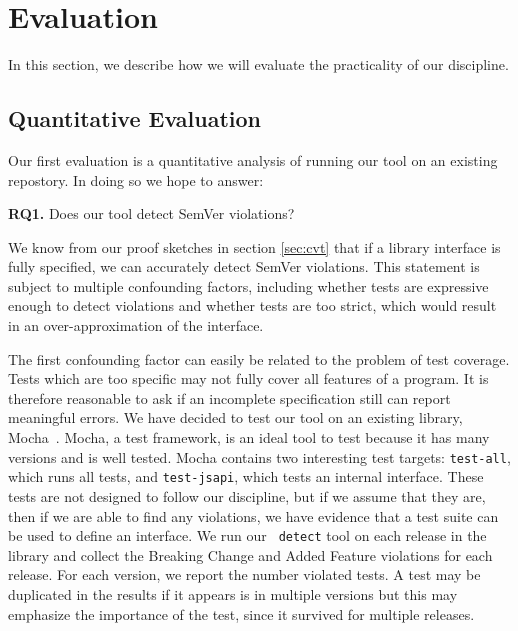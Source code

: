 \section{Evaluation}


In this section, we describe how we will evaluate the practicality of
our discipline.

\subsection{Quantitative Evaluation}

Our first evaluation is a quantitative analysis of running our tool on
an existing repostory. In doing so we hope to answer:

{\bf RQ1.} Does our tool detect SemVer violations?

We know from our proof sketches in section \ref{sec:cvt} that if a
library interface is fully specified, we can accurately detect SemVer
violations. This statement is subject to multiple confounding
factors, including whether tests are expressive enough to detect
violations and whether tests are too strict, which would result in an
over-approximation of the interface.

The first confounding factor can easily be related to the problem of
test coverage. Tests which are too specific may not fully cover all
features of a program. It is therefore reasonable to ask if an
incomplete specification still can report meaningful errors. We have
decided to test our tool on an existing library,
Mocha~\cite{mocha}. Mocha, a test framework, is an ideal tool to test
because it has many versions and is well tested. Mocha contains two
interesting test targets: {\tt test-all}, which runs all tests, and
{\tt test-jsapi}, which tests an internal interface. These tests are
not designed to follow our discipline, but if we assume that they
are, then if we are able to find any violations, we have evidence
that a test suite can be used to define an interface. We run our {\tt
  detect} tool on each release in the library and collect the
Breaking Change and Added Feature violations for each release. For
each version, we report the number violated tests. A test may be
duplicated in the results if it appears is in multiple versions but
this may emphasize the importance of the test, since it survived for
multiple releases.


